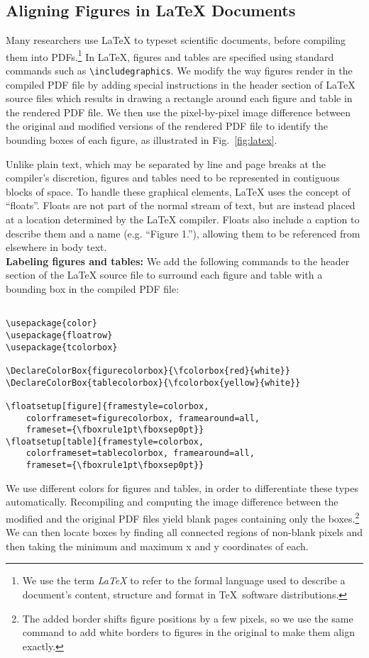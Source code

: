 \documentclass[sigconf]{acmart}
\begin{document}
\subsection{Aligning Figures in LaTeX Documents}\label{sec:align_latex}
Many researchers use LaTeX to typeset scientific documents, before compiling them into PDFs.\footnote{We use the term \emph{LaTeX} to refer to the formal language used to describe a document's content, structure and format in \TeX~software distributions.}
In LaTeX, figures and tables are specified using standard commands such as \verb|\includegraphics|.
We modify the way figures render in the compiled PDF file by adding special instructions in the header section of LaTeX source files which results in drawing a rectangle around each figure and table in the rendered PDF file. 
We then use the pixel-by-pixel image difference between the original and modified versions of the rendered PDF file to identify the bounding boxes of each figure, as illustrated in Fig.~\ref{fig:latex}.

Unlike plain text, which may be separated by line and page breaks at the compiler's discretion, figures and tables need to be represented in contiguous blocks of space. 
To handle these graphical elements, LaTeX uses the concept of ``floats''. 
Floats are not part of the normal stream of text, but are instead placed at a location determined by the LaTeX compiler.
Floats also include a caption to describe them and a name (e.g. ``Figure 1.''), allowing them to be referenced from elsewhere in body text. 
\\[15pt]\textbf{Labeling figures and tables:}%
We add the following commands to the header section of the LaTeX source file to surround each figure and table with a bounding box in the compiled PDF file:

\begin{verbatim}

\usepackage{color}
\usepackage{floatrow}
\usepackage{tcolorbox}

\DeclareColorBox{figurecolorbox}{\fcolorbox{red}{white}}
\DeclareColorBox{tablecolorbox}{\fcolorbox{yellow}{white}}

\floatsetup[figure]{framestyle=colorbox,
    colorframeset=figurecolorbox, framearound=all,
    frameset={\fboxrule1pt\fboxsep0pt}}
\floatsetup[table]{framestyle=colorbox,
    colorframeset=tablecolorbox, framearound=all,
    frameset={\fboxrule1pt\fboxsep0pt}}
\end{verbatim}

We use different colors for figures and tables, in order to differentiate these types automatically.
Recompiling and computing the image difference between the modified and the original PDF files yield blank pages containing only the boxes.\footnote{The added border shifts figure positions by a few pixels, so we use the same command to add white borders to figures in the original to make them align exactly.} We can then locate boxes by finding all connected regions of non-blank pixels and then taking the minimum and maximum x and y coordinates of each.
\\[15pt]%
\end{document}
